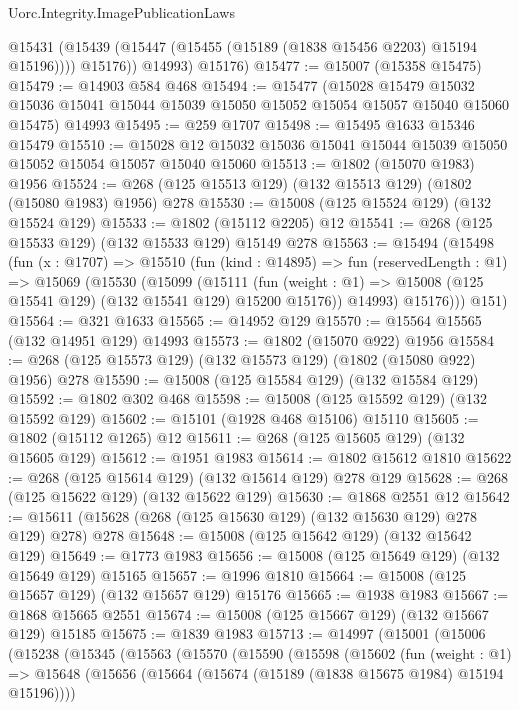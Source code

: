 \begin{lexlean}{Uorc.Integrity.ImagePublicationLaws}
\begin{coremodule}
          @15431 (@15439 (@15447 (@15455 (@15189 (@1838 @15456 @2203) @15194 @15196)))) @15176))
        @14993)
      @15176)
@15477 := @15007 (@15358 @15475)
@15479 := @14903 @584 @468
@15494 := @15477
    (@15028
      @15479
      @15032
      @15036
      @15041
      @15044
      @15039
      @15050
      @15052
      @15054
      @15057
      @15040
      @15060
      @15475)
    @14993
@15495 := @259 @1707
@15498 := @15495 @1633 @15346 @15479
@15510 := @15028 @12 @15032 @15036 @15041 @15044 @15039 @15050 @15052 @15054 @15057 @15040 @15060
@15513 := @1802 (@15070 @1983) @1956
@15524 := @268 (@125 @15513 @129) (@132 @15513 @129) (@1802 (@15080 @1983) @1956) @278
@15530 := @15008 (@125 @15524 @129) (@132 @15524 @129)
@15533 := @1802 (@15112 @2205) @12
@15541 := @268 (@125 @15533 @129) (@132 @15533 @129) @15149 @278
@15563 := @15494
    (@15498
      (fun (x : @1707) =>
      @15510
        (fun (kind : @14895) =>
        fun (reservedLength : @1) =>
        @15069
          (@15530
            (@15099
              (@15111
                (fun (weight : @1) => @15008 (@125 @15541 @129) (@132 @15541 @129) @15200 @15176))
              @14993)
            @15176)))
      @151)
@15564 := @321 @1633
@15565 := @14952 @129
@15570 := @15564 @15565 (@132 @14951 @129) @14993
@15573 := @1802 (@15070 @922) @1956
@15584 := @268 (@125 @15573 @129) (@132 @15573 @129) (@1802 (@15080 @922) @1956) @278
@15590 := @15008 (@125 @15584 @129) (@132 @15584 @129)
@15592 := @1802 @302 @468
@15598 := @15008 (@125 @15592 @129) (@132 @15592 @129)
@15602 := @15101 (@1928 @468 @15106) @15110
@15605 := @1802 (@15112 @1265) @12
@15611 := @268 (@125 @15605 @129) (@132 @15605 @129)
@15612 := @1951 @1983
@15614 := @1802 @15612 @1810
@15622 := @268 (@125 @15614 @129) (@132 @15614 @129) @278 @129
@15628 := @268 (@125 @15622 @129) (@132 @15622 @129)
@15630 := @1868 @2551 @12
@15642 := @15611 (@15628 (@268 (@125 @15630 @129) (@132 @15630 @129) @278 @129) @278) @278
@15648 := @15008 (@125 @15642 @129) (@132 @15642 @129)
@15649 := @1773 @1983
@15656 := @15008 (@125 @15649 @129) (@132 @15649 @129) @15165
@15657 := @1996 @1810
@15664 := @15008 (@125 @15657 @129) (@132 @15657 @129) @15176
@15665 := @1938 @1983
@15667 := @1868 @15665 @2551
@15674 := @15008 (@125 @15667 @129) (@132 @15667 @129) @15185
@15675 := @1839 @1983
@15713 := @14997
    (@15001
      (@15006
        (@15238
          (@15345
            (@15563
              (@15570
                (@15590
                  (@15598
                    (@15602
                      (fun (weight : @1) =>
                      @15648
                        (@15656 (@15664 (@15674 (@15189 (@1838 @15675 @1984) @15194 @15196))))

\end{coremodule}
\end{lexlean}

